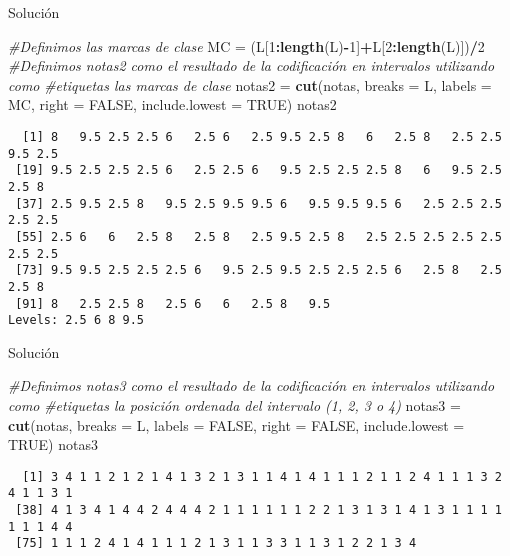 \documentclass[
  ignorenonframetext,
]{beamer}
\newenvironment{Shaded}{\begin{snugshade}}{\end{snugshade}}
\newcommand{\CommentTok}[1]{\textcolor[rgb]{0.56,0.35,0.01}{\textit{#1}}}
\newcommand{\DataTypeTok}[1]{\textcolor[rgb]{0.13,0.29,0.53}{#1}}
\newcommand{\DecValTok}[1]{\textcolor[rgb]{0.00,0.00,0.81}{#1}}
\newcommand{\KeywordTok}[1]{\textcolor[rgb]{0.13,0.29,0.53}{\textbf{#1}}}
\newcommand{\NormalTok}[1]{#1}
\newcommand{\OperatorTok}[1]{\textcolor[rgb]{0.81,0.36,0.00}{\textbf{#1}}}
\newcommand{\OtherTok}[1]{\textcolor[rgb]{0.56,0.35,0.01}{#1}}
\newcommand{\StringTok}[1]{\textcolor[rgb]{0.31,0.60,0.02}{#1}}
\begin{document}
\begin{frame}[fragile]{Solución}
\protect\hypertarget{soluciuxf3n-18}{}
\begin{Shaded}
\begin{Highlighting}[]
\CommentTok{\#Definimos las marcas de clase}
\NormalTok{MC =}\StringTok{ }\NormalTok{(L[}\DecValTok{1}\OperatorTok{:}\KeywordTok{length}\NormalTok{(L)}\OperatorTok{{-}}\DecValTok{1}\NormalTok{]}\OperatorTok{+}\NormalTok{L[}\DecValTok{2}\OperatorTok{:}\KeywordTok{length}\NormalTok{(L)])}\OperatorTok{/}\DecValTok{2}
\CommentTok{\#Definimos notas2 como el resultado de la codificación en intervalos utilizando como }
\CommentTok{\#etiquetas las marcas de clase}
\NormalTok{notas2 =}\StringTok{ }\KeywordTok{cut}\NormalTok{(notas, }\DataTypeTok{breaks =}\NormalTok{ L, }\DataTypeTok{labels =}\NormalTok{ MC, }\DataTypeTok{right =} \OtherTok{FALSE}\NormalTok{, }\DataTypeTok{include.lowest =} \OtherTok{TRUE}\NormalTok{)}
\NormalTok{notas2}
\end{Highlighting}
\end{Shaded}

\begin{verbatim}
  [1] 8   9.5 2.5 2.5 6   2.5 6   2.5 9.5 2.5 8   6   2.5 8   2.5 2.5 9.5 2.5
 [19] 9.5 2.5 2.5 2.5 6   2.5 2.5 6   9.5 2.5 2.5 2.5 8   6   9.5 2.5 2.5 8  
 [37] 2.5 9.5 2.5 8   9.5 2.5 9.5 9.5 6   9.5 9.5 9.5 6   2.5 2.5 2.5 2.5 2.5
 [55] 2.5 6   6   2.5 8   2.5 8   2.5 9.5 2.5 8   2.5 2.5 2.5 2.5 2.5 2.5 2.5
 [73] 9.5 9.5 2.5 2.5 2.5 6   9.5 2.5 9.5 2.5 2.5 2.5 6   2.5 8   2.5 2.5 8  
 [91] 8   2.5 2.5 8   2.5 6   6   2.5 8   9.5
Levels: 2.5 6 8 9.5
\end{verbatim}
\end{frame}

\begin{frame}[fragile]{Solución}
\protect\hypertarget{soluciuxf3n-19}{}
\begin{Shaded}
\begin{Highlighting}[]
\CommentTok{\#Definimos notas3 como el resultado de la codificación en intervalos utilizando como }
\CommentTok{\#etiquetas la posición ordenada del intervalo (1, 2, 3 o 4)}
\NormalTok{notas3 =}\StringTok{ }\KeywordTok{cut}\NormalTok{(notas, }\DataTypeTok{breaks =}\NormalTok{ L, }\DataTypeTok{labels =} \OtherTok{FALSE}\NormalTok{, }\DataTypeTok{right =} \OtherTok{FALSE}\NormalTok{, }\DataTypeTok{include.lowest =} \OtherTok{TRUE}\NormalTok{)}
\NormalTok{notas3}
\end{Highlighting}
\end{Shaded}

\begin{verbatim}
  [1] 3 4 1 1 2 1 2 1 4 1 3 2 1 3 1 1 4 1 4 1 1 1 2 1 1 2 4 1 1 1 3 2 4 1 1 3 1
 [38] 4 1 3 4 1 4 4 2 4 4 4 2 1 1 1 1 1 1 2 2 1 3 1 3 1 4 1 3 1 1 1 1 1 1 1 4 4
 [75] 1 1 1 2 4 1 4 1 1 1 2 1 3 1 1 3 3 1 1 3 1 2 2 1 3 4
\end{verbatim}
\end{frame}
\end{document}

